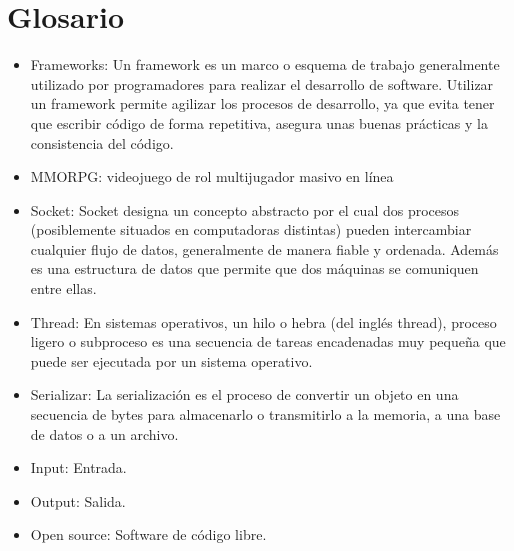 \chapter{Glosario}
\begin{itemize}
    \item Frameworks: Un framework es un marco o esquema de trabajo generalmente utilizado por programadores para realizar el desarrollo de software. Utilizar un framework permite agilizar los procesos de desarrollo, ya que evita tener que escribir código de forma repetitiva, asegura unas buenas prácticas y la consistencia del código.
    \item MMORPG: videojuego de rol multijugador masivo en línea
    \item Socket: Socket designa un concepto abstracto por el cual dos procesos (posiblemente situados en computadoras distintas) pueden intercambiar cualquier flujo de datos, generalmente de manera fiable y ordenada. Además es una estructura de datos que permite que dos máquinas se comuniquen entre ellas.
    \item Thread: En sistemas operativos, un hilo o hebra (del inglés thread), proceso ligero o subproceso es una secuencia de tareas encadenadas muy pequeña que puede ser ejecutada por un sistema operativo.
    \item Serializar: La serialización es el proceso de convertir un objeto en una secuencia de bytes para almacenarlo o transmitirlo a la memoria, a una base de datos o a un archivo. 
    \item Input: Entrada.
    \item Output: Salida.
    \item Open source: Software de código libre.
\end{itemize}